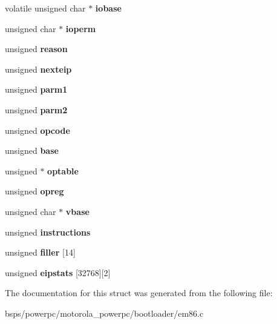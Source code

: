 \begin{DoxyCompactItemize}
\item 
\mbox{\label{struct__x86_a36e3be91f1109fe7f11a34850e9d9039}} 
volatile unsigned char $\ast$ {\bfseries iobase}
\item 
\mbox{\label{struct__x86_a889351e21a3346baefbce5024592f169}} 
unsigned char $\ast$ {\bfseries ioperm}
\item 
\mbox{\label{struct__x86_a14e6cc6d7089b704dfcfe7077a93f579}} 
unsigned {\bfseries reason}
\item 
\mbox{\label{struct__x86_a2d5f607e60ffbcbfe7eca5a75a2ae335}} 
unsigned {\bfseries nexteip}
\item 
\mbox{\label{struct__x86_a5324bd320482646827e8cb7b628ca042}} 
unsigned {\bfseries parm1}
\item 
\mbox{\label{struct__x86_a018db60f490f8b1e7334666f49e6fb6f}} 
unsigned {\bfseries parm2}
\item 
\mbox{\label{struct__x86_ad71a4d2f0cb0d09951101ee759498ab9}} 
unsigned {\bfseries opcode}
\item 
\mbox{\label{struct__x86_a06f54ce22a8cd458ce769a70f541cdfe}} 
unsigned {\bfseries base}
\item 
\mbox{\label{struct__x86_aa3c79c5f77836e3d7072b277ad91c038}} 
unsigned $\ast$ {\bfseries optable}
\item 
\mbox{\label{struct__x86_ad57daf9771dde6d8105f96c71aafe7b1}} 
unsigned {\bfseries opreg}
\item 
\mbox{\label{struct__x86_a53f217d0da7a4be1922c19cf9166f9da}} 
unsigned char $\ast$ {\bfseries vbase}
\item 
\mbox{\label{struct__x86_a8f396d5fa3eaf4a0c9d2a623ff15a3f9}} 
unsigned {\bfseries instructions}
\item 
\mbox{\label{struct__x86_a5342cacef1fc1d28fd910ca4ef48f9e7}} 
unsigned {\bfseries filler} \mbox{[}14\mbox{]}
\item 
\mbox{\label{struct__x86_a04df3acc0bec70bdc88cd23183c427f3}} 
unsigned {\bfseries eipstats} \mbox{[}32768\mbox{]}\mbox{[}2\mbox{]}
\end{DoxyCompactItemize}


The documentation for this struct was generated from the following file\+:\begin{DoxyCompactItemize}
\item 
bsps/powerpc/motorola\+\_\+powerpc/bootloader/em86.\+c\end{DoxyCompactItemize}
